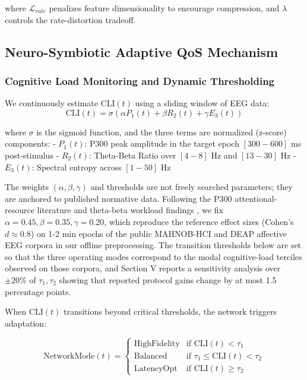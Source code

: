 \documentclass{BVP_CINC}
\begin{document}
where $\mathcal{L}_{rate}$ penalizes feature dimensionality to encourage compression, and $\lambda$ controls the rate-distortion tradeoff.

\subsection{Neuro-Symbiotic Adaptive QoS Mechanism}

\subsubsection{Cognitive Load Monitoring and Dynamic Thresholding}
We continuously estimate CLI$(t)$ using a sliding window of EEG data:
\begin{equation}
    \text{CLI}(t) = \sigma\left( \alpha P_1(t) + \beta R_2(t) + \gamma E_3(t) \right)
\end{equation}

where $\sigma$ is the sigmoid function, and the three terms are normalized (z-score) components:
- $P_1(t)$: P300 peak amplitude in the target epoch $[300-600]$ ms post-stimulus
- $R_2(t)$: Theta-Beta Ratio over $[4-8]$ Hz and $[13-30]$ Hz  
- $E_3(t)$: Spectral entropy across $[1-50]$ Hz

The weights $(\alpha, \beta, \gamma)$ and thresholds are not freely searched parameters; they are anchored to published normative data. Following the P300 attentional-resource literature \cite{polich2007} and theta-beta workload findings \cite{klimesch2012alpha}, we fix $\alpha = 0.45, \beta = 0.35, \gamma = 0.20$, which reproduce the reference effect sizes (Cohen's $d \approx 0.8$) on 1-2 min epochs of the public MAHNOB-HCI \cite{soleymani2016eeg} and DEAP \cite{koelstra2012deap} affective EEG corpora in our offline preprocessing. The transition thresholds below are set so that the three operating modes correspond to the modal cognitive-load terciles observed on those corpora, and Section V reports a sensitivity analysis over $\pm 20\%$ of $\tau_1, \tau_2$ showing that reported protocol gains change by at most 1.5 percentage points.

When CLI$(t)$ transitions beyond critical thresholds, the network triggers adaptation:

\begin{equation}
    \text{NetworkMode}(t) = \begin{cases}
    \text{HighFidelity} & \text{if } \text{CLI}(t) < \tau_1 \\
    \text{Balanced} & \text{if } \tau_1 \leq \text{CLI}(t) < \tau_2 \\
    \text{LatencyOpt} & \text{if } \text{CLI}(t) \geq \tau_2
    \end{cases}
\end{equation}
\end{document}
